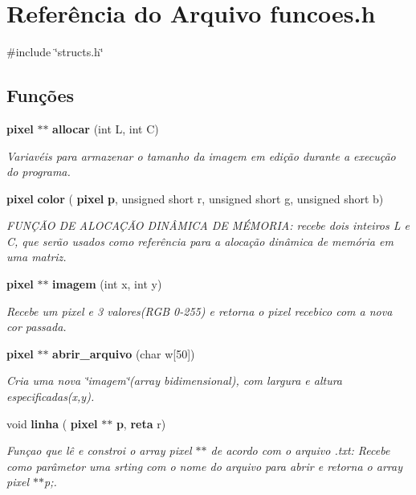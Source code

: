 \section{Referência do Arquivo funcoes.\+h}
\label{funcoes_8h}
{\ttfamily \#include \char`\"{}structs.\+h\char`\"{}}\newline
\subsection*{Funções}
\begin{DoxyCompactItemize}
\item 
\textbf{ pixel} $\ast$$\ast$ \textbf{ allocar} (int L, int C)
\begin{DoxyCompactList}\small\item\em Variavéis para armazenar o tamanho da imagem em edição durante a execução do programa. \end{DoxyCompactList}\item 
\textbf{ pixel} \textbf{ color} (\textbf{ pixel} \textbf{ p}, unsigned short r, unsigned short g, unsigned short b)
\begin{DoxyCompactList}\small\item\em F\+U\+NÇÃO DE A\+L\+O\+C\+AÇÃO D\+I\+NÂ\+M\+I\+CA DE MÉ\+M\+O\+R\+IA\+: recebe dois inteiros L e C, que serão usados como referência para a alocação dinâmica de memória em uma matriz. \end{DoxyCompactList}\item 
\textbf{ pixel} $\ast$$\ast$ \textbf{ imagem} (int x, int y)
\begin{DoxyCompactList}\small\item\em Recebe um pixel e 3 valores(R\+GB 0-\/255) e retorna o pixel recebico com a nova cor passada. \end{DoxyCompactList}\item 
\textbf{ pixel} $\ast$$\ast$ \textbf{ abrir\+\_\+arquivo} (char w[50])
\begin{DoxyCompactList}\small\item\em Cria uma nova \char`\"{}imagem\char`\"{}(array bidimensional), com largura e altura especificadas(x,y). \end{DoxyCompactList}\item 
void \textbf{ linha} (\textbf{ pixel} $\ast$$\ast$\textbf{ p}, \textbf{ reta} r)
\begin{DoxyCompactList}\small\item\em Funçao que lê e constroi o array pixel $\ast$$\ast$ de acordo com o arquivo .txt\+: Recebe como parâmetor uma srting com o nome do arquivo para abrir e retorna o array pixel $\ast$$\ast$p;. \end{DoxyCompactList}\item 

\end{DoxyCompactItemize}
